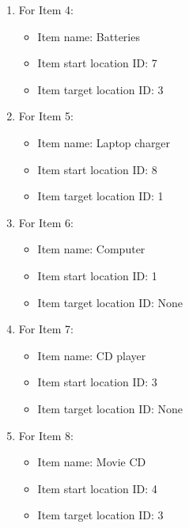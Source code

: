 \documentclass[11pt]{article}
\begin{document}
\begin{enumerate}
\begin{enumerate}
\begin{enumerate}
        \item For Item 4:
        \begin{itemize}
            \item Item name: Batteries
            \item Item start location ID: 7
            \item Item target location ID: 3
        \end{itemize}

        \item For Item 5:
        \begin{itemize}
            \item Item name: Laptop charger
            \item Item start location ID: 8
            \item Item target location ID: 1
        \end{itemize}

        \item For Item 6:
        \begin{itemize}
            \item Item name: Computer
            \item Item start location ID: 1
            \item Item target location ID: None
        \end{itemize}

        \item For Item 7:
        \begin{itemize}
            \item Item name: CD player
            \item Item start location ID: 3
            \item Item target location ID: None
        \end{itemize}

        \item For Item 8:
        \begin{itemize}
            \item Item name: Movie CD
            \item Item start location ID: 4
            \item Item target location ID: 3
        \end{itemize}
    \end{enumerate}
\end{enumerate}



\end{enumerate}
\end{document}
